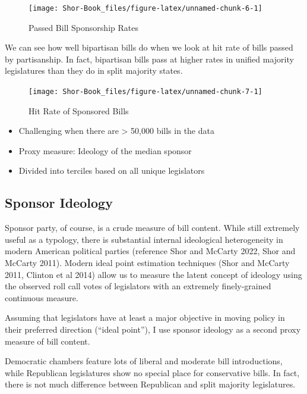 \documentclass[
  oneside]{book}
\providecommand{\tightlist}{%
  \setlength{\itemsep}{0pt}\setlength{\parskip}{0pt}}
\begin{document}
\begin{figure}
\texttt{[image: Shor-Book\_files/figure-latex/unnamed-chunk-6-1]} \caption{Passed Bill Sponsorship Rates}\label{fig:unnamed-chunk-6}
\end{figure}

We can see how well bipartisan bills do when we look at hit rate of bills passed by partisanship. In fact, bipartisan bills pass at higher rates in unified majority legislatures than they do in split majority states.

\begin{figure}
\texttt{[image: Shor-Book\_files/figure-latex/unnamed-chunk-7-1]} \caption{Hit Rate of Sponsored Bills}\label{fig:unnamed-chunk-7}
\end{figure}

\begin{itemize}
\tightlist
\item
  Challenging when there are \textgreater{} 50,000 bills in the data
\item
  Proxy measure: Ideology of the median sponsor
\item
  Divided into terciles based on all unique legislators
\end{itemize}

\hypertarget{sponsor-ideology}{%
\subsection{Sponsor Ideology}\label{sponsor-ideology}}

Sponsor party, of course, is a crude measure of bill content. While still extremely useful as a typology, there is substantial internal ideological heterogeneity in modern American political parties (reference Shor and McCarty 2022, Shor and McCarty 2011). Modern ideal point estimation techniques (Shor and McCarty 2011, Clinton et al 2014) allow us to measure the latent concept of ideology using the observed roll call votes of legislators with an extremely finely-grained continuous measure.

Assuming that legislators have at least a major objective in moving policy in their preferred direction (``ideal point''), I use sponsor ideology as a second proxy measure of bill content.

Democratic chambers feature lots of liberal and moderate bill introductions, while Republican legislatures show no special place for conservative bills. In fact, there is not much difference between Republican and split majority legislatures.
\end{document}
